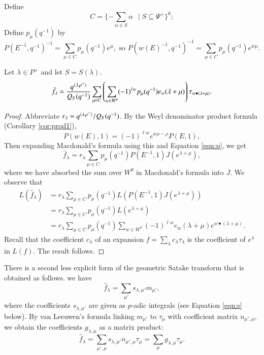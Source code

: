 Define
\[
C = \{  - \sum_{\alpha\in S}\alpha \ \ \mid S \subseteq \Psi^+ \}^\theta;
\]
Define $p_\mu(q^{-1})$ by
\begin{equation}\label{eqn:p}
 P(E^{-1},q^{-1})^{-1} = \sum_{\mu\in C} p_\mu(q^{-1}) e^{\mu},
\text{\ \ so }  P(w(E)^{-1},q^{-1})^{-1} 
= \sum_{\mu\in C} p_\mu(q^{-1}) e^{w\mu}.
\end{equation}

\begin{theorem}\label{thm:gs}  Let $\lambda\in P^+$ and let $S=S(\lambda)$.
\[
\hat f_\lambda = \frac{q^{\langle{\lambda,\rho^\vee}\rangle}}{Q_S(q^{-1})} 
\sum_{\mu\in C}\left(\sum_{w\in W^\theta} 
(-1)^{\ell w} p_{\mu}(q^{-1}) e_w(\lambda+\mu)\right)  
\tau_{w\bullet(\lambda+\mu)}.
\]
\end{theorem}

\begin{proof}
  Abbreviate $r_\lambda = q^{\langle{\lambda,\rho^\vee}\rangle}/Q_S(q^{-1})$.
  By the Weyl denominator product formula (Corollary \ref{cor:prod1}),
\begin{equation}
P(w(E),1) = (-1)^{\ell w} e^{w\rho - \rho} P(E,1),
\end{equation}
Then expanding Macdonald's formula using this and Equation
\ref{eqn:p}, we get
\[
\hat f_\lambda = r_\lambda \sum_{\mu\in C} p_\mu(q^{-1}) P(E^{-1},1) J (e^{\lambda+\mu}),
\]
where we have absorbed the sum over $W^\theta$ in Macdonald's formula
into $J$.  We observe that
\begin{align*}
L(\hat f_\lambda) &= r_\lambda 
\sum_{\mu\in C} p_\mu(q^{-1}) L(P(E^{-1},1) J(e^{\lambda+\mu})) \\
&= 
r_\lambda \sum_{\mu\in C} p_\mu(q^{-1}) L(e^{\lambda+\mu}) \\
&= 
r_\lambda
\sum_{\mu\in C} p_\mu(q^{-1}) 
\sum_{w\in W^\theta} (-1)^{\ell w} e_w(\lambda+\mu) e^{w\bullet (\lambda+\mu)}.
\end{align*}
Recall that the coefficient $c_\lambda$ of an expansion $f =
\sum_\lambda c_\lambda\tau_\lambda$ is the coefficient of $e^\lambda$
in $L(f)$.  The result follows.
\end{proof}

There is a second less explicit form of the geometric Satake transform
that is obtained as follows.  we have
\[
\hat f_\lambda = \sum_{\mu'} s_{\lambda,\mu'} m_{\mu'},
\]
where the coefficients $s_{\lambda,\mu'}$ are given as $p$-adic
integrals (see Equation \ref{eqn:s} below).  By van Leeuwen's formula
linking $m_{\mu'}$ to $\tau_\mu$ with coefficient matrix
$n_{\mu',\mu}$, we obtain the coefficients $g_{\lambda,\mu}$ as a
matrix product:
\begin{equation}
\hat f_\lambda 
= \sum_{\mu',\mu} s_{\lambda,\mu'} n_{\mu',\mu}
\tau_{\mu} 
= \sum_{\mu} g_{\lambda,\mu} \tau_\mu.
\end{equation}

